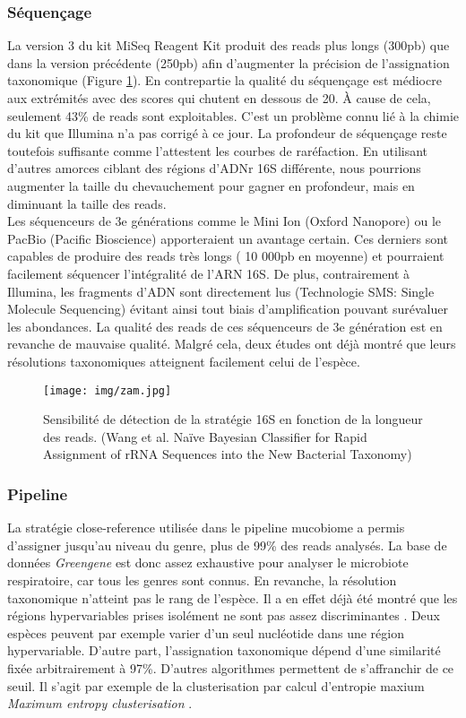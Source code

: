 \documentclass[12pt,a4paper]{article}
\begin{document}
\subsubsection{Séquençage}
La version 3 du kit MiSeq Reagent Kit produit des reads plus longs (300pb) que dans la version précédente (250pb) afin d'augmenter la précision de l'assignation taxonomique (Figure \ref{rnasens}). En contrepartie la qualité du séquençage est médiocre aux extrémités avec des scores qui chutent en dessous de 20. À cause de cela, seulement 43\% de reads sont exploitables.
C'est un problème connu lié à la chimie du kit que Illumina n'a pas corrigé à ce jour. La profondeur de séquençage reste toutefois suffisante comme l'attestent les courbes de raréfaction. En utilisant d'autres amorces ciblant des régions d'ADNr 16S différente, nous pourrions augmenter la taille du chevauchement pour gagner en profondeur, mais en diminuant la taille des reads. \\
Les séquenceurs de 3e générations comme le Mini Ion (Oxford Nanopore) ou le PacBio (Pacific Bioscience) apporteraient un avantage certain. Ces derniers sont capables de produire des reads très longs ( 10 000pb en moyenne) et pourraient facilement séquencer l'intégralité de l'ARN 16S. De plus, contrairement à Illumina, les fragments d'ADN sont directement lus (Technologie SMS: Single Molecule Sequencing) évitant ainsi tout biais d'amplification pouvant surévaluer les abondances.
La qualité des reads de ces séquenceurs de 3e génération est en revanche de mauvaise qualité. Malgré cela, deux études\cite{Wagner2016,Benitez-Paez2016} ont déjà montré que leurs résolutions taxonomiques atteignent facilement celui de l’espèce.

\begin{figure}
\begin{center}
\texttt{[image: img/zam.jpg]}\hfill
\end{center}
\caption{Sensibilité de détection de la stratégie 16S en fonction de la longueur des reads. (Wang et al. Naïve Bayesian Classifier for Rapid Assignment of rRNA Sequences into the New Bacterial Taxonomy) }
\label{rnasens}
\end{figure}

\subsubsection{Pipeline}
La stratégie close-reference utilisée dans le pipeline mucobiome a permis d'assigner jusqu'au niveau du genre, plus de 99\% des reads analysés. La base de données \textit{Greengene} est donc assez exhaustive pour analyser le microbiote respiratoire, car tous les genres sont connus.
En revanche, la résolution taxonomique n'atteint pas le rang de l'espèce. Il a en effet déjà été montré que les régions hypervariables prises isolément ne sont pas assez discriminantes \cite{Yang2016}. Deux espèces peuvent par exemple varier d'un seul nucléotide dans une région hypervariable.
D'autre part, l'assignation taxonomique dépend d'une similarité fixée arbitrairement à 97\%. D'autres algorithmes permettent de s'affranchir de ce seuil. Il s'agit par exemple de la clusterisation par calcul d'entropie maxium \textit{Maximum entropy clusterisation} \cite{Bobadilla2015}.
\end{document}
